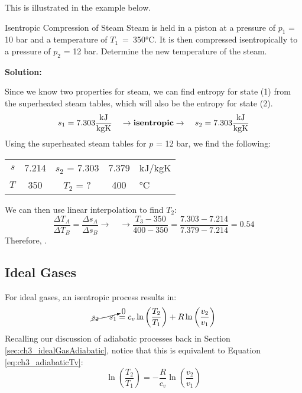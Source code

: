 This is illustrated in the example below.
\begin{example}{Isentropic Compression of Steam}
  Steam is held in a piston at a pressure of $p_1$ = 10 bar and a temperature of \mbox{$T_1$ = 350°C}. It is then compressed isentropically to a pressure of $p_2$ = 12 bar.  Determine the new temperature of the steam.

  {\bf Solution:}

  Since we know two properties for steam, we can find entropy for state (1) from the superheated steam tables, which will also be the entropy for state (2).
  \begin{equation*}
    s_1 = 7.303 \frac{\rm kJ}{\rm kg K} \quad \rightarrow {\rm \bf isentropic} \rightarrow \quad s_2 = 7.303 \frac{\rm kJ}{\rm kg K}
    \end{equation*}
  Using the superheated steam tables for $p$ = 12 bar, we find the following:
  \begin{center}
    \def\arraystretch{1.5}
    \begin{tabular}{r|c|c|c|l}
      $s$ & 7.214 & $s_2$ = 7.303 & 7.379 & kJ/kgK \\ \cline{2-4}
      $T$ & 350 & $T_2$ = ? & 400 & °C
    \end{tabular}
    \def\arraystretch{1.0}
  \end{center}
  We can then use linear interpolation to find $T_2$:
  \begin{equation*}
    \frac{\Delta T_A}{\Delta T_B} = \frac{\Delta s_A}{\Delta s_B} \rightarrow\quad\rightarrow \frac{T_3 - 350}{400-350} = \frac{7.303 - 7.214}{7.379 - 7.214} = 0.54
  \end{equation*}
  Therefore, .
\end{example}

\subsection{Ideal Gases}
For ideal gases, an isentropic process results in:
\begin{equation*}
  \cancelto{0}{s_2 - s_1} = c_v \ln \left(\frac{T_2}{T_1}\right) + R \ln \left(\frac{v_2}{v_1}\right)
\end{equation*}
Recalling our discussion of adiabatic processes back in Section \ref{sec:ch3_idealGasAdiabatic}, notice that this is equivalent to Equation \ref{eq:ch3_adiabaticTv}:
\begin{equation*}
  \ln \left(\frac{T_2}{T_1}\right) = -\frac{R}{c_v} \ln \left(\frac{v_2}{v_1}\right)
\end{equation*}


